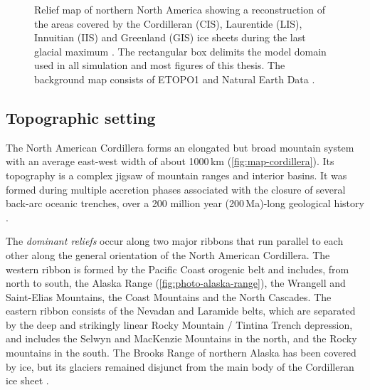 \documentclass{article}
\newcommand{\todo}[1]{} %
\newcommand{\chem}[1]{\ensuremath{\mathrm{#1}}}
\begin{document}
\begin{figure}
  \centering
  \caption{Relief map of northern North America showing a reconstruction of the
           areas covered by the Cordilleran (CIS), Laurentide (LIS), Innuitian
           (IIS) and Greenland (GIS) ice sheets during the last glacial maximum
           \citep[21.4 to 16.8\,cal\,\chem{^{14}C}\,kyr\,BP,][]{Dyke.2004}.
           The rectangular box delimits the model domain used in all simulation
           and most figures of this thesis. The background
           map consists of ETOPO1 \citep{Amante.Eakins.2009} and Natural Earth
           Data \citep{Patterson.Kelso.2014}.}
  \label{fig:map-northamerica}
\end{figure}

\subsection{Topographic setting}

The North American Cordillera forms an elongated but broad mountain system with
an average east-west width of about 1000\,km (\cref{fig:map-cordillera}). Its
topography is a complex jigsaw of mountain ranges and interior basins. It was
formed during multiple accretion phases associated with the closure of several
back-arc oceanic trenches, over a 200 million year (200\,Ma)-long geological
history \citep{Sigloch.Mihalynuk.2013}.

The \emph{dominant reliefs} occur along two major ribbons that run parallel to
each other along the general orientation of the North American Cordillera. The
western ribbon is formed by the Pacific Coast orogenic belt and includes, from
north to south, the Alaska Range (\cref{fig:photo-alaska-range}), the Wrangell
and Saint-Elias Mountains,
the Coast Mountains and the North Cascades. The eastern ribbon consists of the
Nevadan and Laramide belts, which are separated by the deep and strikingly
linear Rocky Mountain / Tintina Trench depression, and includes the Selwyn and
MacKenzie Mountains in the north, and the Rocky mountains in the south. The
Brooks Range of northern Alaska has been covered by ice, but its glaciers
remained disjunct from the main body of the Cordilleran ice sheet
\citep{Kaufman.Manley.2004}.

\todo{Go to geolibrary and check \emph{Geology of Canada} books and such for a
      reference about the three orogenic belts.}
\end{document}

